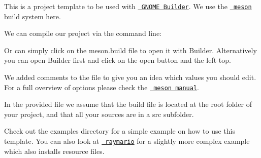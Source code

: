 This is a project template to be used with \href{https://raw.githubusercontent.com/jubalh/raymario/master/meson.build}{\texttt{ G\+N\+O\+ME Builder}}. We use the \href{https://raw.githubusercontent.com/jubalh/raymario/master/meson.build}{\texttt{ meson}} build system here.

We can compile our project via the command line\+: 
\begin{DoxyCode}{0}
\end{DoxyCode}


Or can simply click on the {\ttfamily meson.\+build} file to open it with Builder. Alternatively you can open Builder first and click on the {\ttfamily open} button and the left top.

We added comments to the file to give you an idea which values you should edit. For a full overview of options please check the \href{http://mesonbuild.com/Manual.html}{\texttt{ meson manual}}.

In the provided file we assume that the build file is located at the root folder of your project, and that all your sources are in a {\ttfamily src} subfolder.

Check out the {\ttfamily examples} directory for a simple example on how to use this template. You can also look at \href{https://github.com/jubalh/raymario}{\texttt{ raymario}} for a slightly more complex example which also installs resource files. 